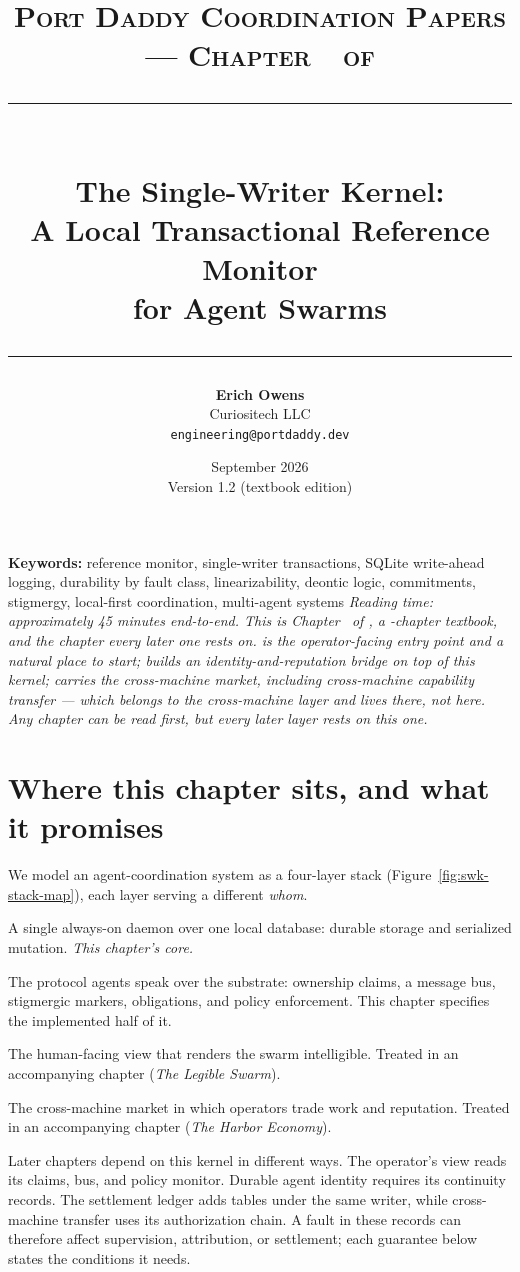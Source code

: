 \documentclass[11pt,a4paper]{article}
\title{
  \vspace{-1cm}
  {\Large\textsc{Port Daddy Coordination Papers --- Chapter~\pdchapternumber\ of \pdchaptercount}}\\[
0.5cm]
  \rule{\textwidth}{0.5pt}\\[0.3cm]
  {\LARGE\textbf{The Single-Writer Kernel:}}\\[0.2cm]
  {\Large A Local Transactional Reference Monitor\\for Agent Swarms}\\[0.3cm]
  \rule{\textwidth}{0.5pt}
}
\author{
  \textbf{Erich Owens}\\[0.2cm]
  Curiositech LLC\\[0.2cm]
  \texttt{engineering@portdaddy.dev}
}
\date{September 2026\\Version 1.2 (textbook edition)}
\theoremstyle{definition}
\theoremstyle{remark}
\begin{document}
\pdopensolutions
\setlength{\emergencystretch}{2em}
\maketitle
\thispagestyle{empty}
\vspace{0.6cm}
\vspace{0.4cm}
\noindent\textbf{Keywords:} reference monitor, single-writer transactions, SQLite
write-ahead logging, durability by fault class, linearizability, deontic logic,
commitments, stigmergy, local-first coordination, multi-agent systems
\vspace{0.4cm}
\noindent\textit{Reading time: approximately 45 minutes end-to-end. This is Chapter~\pdchapternumber{} of \pdbooktitle{}, a
\pdchaptercountword-chapter textbook, and the chapter every later one rests on.
 is the operator-facing entry point and a natural
place to start;  builds an
identity-and-reputation bridge on top of this kernel;  carries the cross-machine market, including
cross-machine capability transfer --- which belongs to the cross-machine layer and
lives there, not here. Any chapter can be read first, but every later layer rests on
this one.}
\tableofcontents
\newpage
\section{Where this chapter sits, and what it promises}

We model an agent-coordination system as a four-layer stack
(Figure~\ref{fig:swk-stack-map}), each layer serving a different \emph{whom}.
\begin{description}[leftmargin=2.2em,style=nextline]
\item[Substrate (the machine).] A single always-on daemon over one local database:
durable storage and serialized mutation. \emph{This chapter's core.}
\item[Coordination (the agents).] The protocol agents speak over the substrate:
ownership claims, a message bus, stigmergic markers, obligations, and policy
enforcement. This chapter specifies the implemented half of it.
\item[Legibility (the operator).] The human-facing view that renders the swarm
intelligible. Treated in an accompanying chapter (\emph{The Legible Swarm}).
\item[Economy (the market between operators).] The cross-machine market in which
operators trade work and reputation. Treated in an accompanying chapter (\emph{The
Harbor Economy}).
\end{description}
\noindent Later chapters depend on this kernel in different ways.
The operator's view reads its claims, bus, and policy monitor. Durable agent
identity requires its continuity records. The settlement ledger adds tables
under the same writer, while cross-machine transfer uses its authorization
chain. A fault in these records can therefore affect supervision, attribution,
or settlement; each guarantee below states the conditions it needs.
\end{document}
